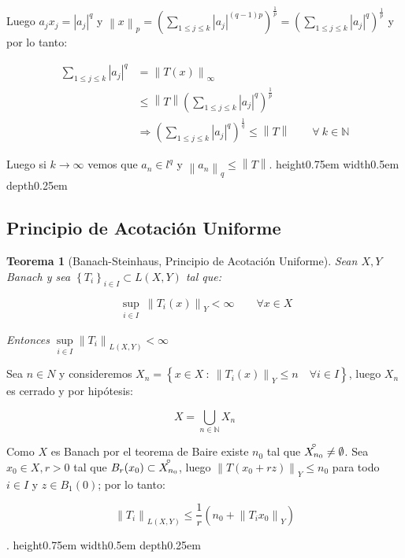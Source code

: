 \documentclass[11pt]{article}
\newcommand{\N}{{\mathbb{N}}}
\newcommand\tq{~:~}
\newcommand{\norm}[1]{\left\lVert#1\right\rVert}
\newcommand{\abs}[1]{\left\lvert#1\right\rvert}
\newcommand{\sett}[1]{\left\lbrace#1\right\rbrace}
\newcommand{\interior}[1]{\accentset{\smash{\raisebox{-0.12ex}{$\scriptstyle\circ$}}}{#1}\rule{0pt}{2.3ex}}
\newcommand{\Bigcup}[2]{\bigcup\limits_{#1}{#2}}
\newcommand{\Bigsum}[2]{\sum\limits_{#1}{#2}}
\newtheorem{theorem}{Teorema}
\numberwithin{theorem}{subsection}
\newenvironment{proof}[1][Demostraci\'on]{\begin{trivlist}
		\item[\hskip \labelsep {\bfseries #1}]}{\end{trivlist}}
\newcommand{\qed}{\nobreak \ifvmode \relax \else
	\ifdim\lastskip<1.5em \hskip-\lastskip
	\hskip1.5em plus0em minus0.5em \fi \nobreak
	\vrule height0.75em width0.5em depth0.25em\fi}
\begin{document}
\begin{proof}
	Luego $a_jx_j = \abs{a_j}^q$ y $\norm{x}_p = \left(\Bigsum{1 \leq j \leq k}{\abs{a_j}^{(q-1)p}}\right)^{\frac{1}{p}} = \left(\Bigsum{1 \leq j \leq k}{\abs{a_j}^{q}}\right)^{\frac{1}{p}}$ y por lo tanto:
	
	\[
	\begin{aligned}
		\Bigsum{1 \leq j \leq k}{\abs{a_j}^q} & = \norm{T(x)}_{\infty} \\
		& \leq \norm{T}\left(\Bigsum{1 \leq j \leq k}{\abs{a_j}^{q}}\right)^{\frac{1}{p}} \\
		& \Longrightarrow \left(\Bigsum{1 \leq j \leq k}{\abs{a_j}^q}\right)^{\frac{1}{q}} \leq \norm{T} \qquad \forall \ k \in \N
	\end{aligned}
	\]
	
	Luego si $k \rightarrow \infty$ vemos que $a_n \in l^q$ y $\norm{a_n}_q \leq \norm{T}$. \qed
	
\end{proof}

\subsection{Principio de Acotaci\'on Uniforme}

\begin{theorem}[Banach-Steinhaus, Principio de Acotaci\'on Uniforme]
	\label{PAU operadores}
	Sean $X,Y$ Banach y sea $\sett{T_i}_{i \in I} \subset L(X,Y)$ tal que:
	
	\begin{equation*}
		\sup\limits_{\substack{i \in I}} \norm{T_i(x)}_Y < \infty \qquad \forall x \in X
	\end{equation*}
	
	Entonces $\sup\limits_{i \in I} \norm{T_i}_{L(X,Y)} < \infty$
	
\end{theorem}

\begin{proof}
	
	Sea $n \in N$ y consideremos $X_n = \sett{x \in X \tq \norm{T_i(x)}_Y \leq n \quad \forall i \in I}$, luego $X_n$ es cerrado y por hip\'otesis:
	
	\[
	X = \Bigcup{n \in \N}{X_n}
	\]
	
	Como $X$ es Banach por el teorema de Baire existe $n_0$ tal que $\interior{X_{n_0}} \neq \emptyset$. Sea $x_0 \in X, r > 0$ tal que $B_r(x_0) \subset \interior{X_{n_0}}$, luego $\norm{T(x_0 + rz)}_{Y} \leq n_0$ para todo $i \in I$ y $z \in B_1(0)$; por lo tanto:
	
	
	\begin{equation*}
		\norm{T_i}_{L(X,Y)} \leq \frac{1}{r} \left(n_0 + \norm{T_ix_0}_Y\right)
	\end{equation*}
	
	.\qed
	
\end{proof}
\end{document}

